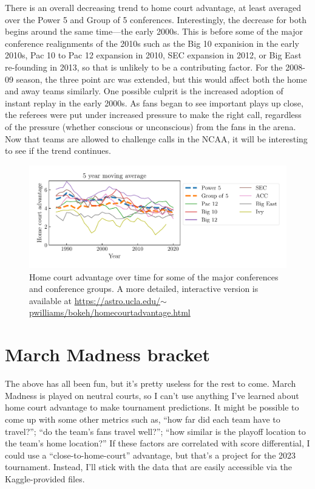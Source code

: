 \documentclass[twocolumn]{aastex63}
\begin{document}
There is an overall decreasing trend to home court advantage, at least averaged over the Power 5 and Group of 5 conferences.
Interestingly, the decrease for both begins around the same time---the early 2000s.
This is before some of the major conference realignments of the 2010s such as the Big 10 expanision in the early 2010s, Pac 10 to Pac 12 expansion in 2010, SEC expansion in 2012, or Big East re-founding in 2013, so that is unlikely to be a contributing factor.
For the 2008-09 season, the three point arc was extended, but this would affect both the home and away teams similarly.
One possible culprit is the increased adoption of instant replay in the early 2000s.
As fans began to see important plays up close, the referees were put under increased pressure to make the right call, regardless of the pressure (whether conscious or unconscious) from the fans in the arena.
Now that teams are allowed to challenge calls in the NCAA, it will be interesting to see if the trend continues.

\begin{figure}
\centering
\includegraphics[width=6in]{figs/homecourtadvantage_vs_year.pdf}
\caption{Home court advantage over time for some of the major conferences and conference groups. A more detailed, interactive version is available at \href{https://astro.ucla.edu/\~pwilliams/bokeh/homecourtadvantage.html}{https://astro.ucla.edu/$\sim$pwilliams/bokeh/homecourtadvantage.html}}
\label{fig:homecourtadvantage_vs_year}
\end{figure}

\section{March Madness bracket}
\label{sect:marchmadness}
The above has all been fun, but it's pretty useless for the rest to come.
March Madness is played on neutral courts, so I can't use anything I've learned about home court advantage to make tournament predictions.
It might be possible to come up with some other metrics such as, ``how far did each team have to travel?''; ``do the team's fans travel well?''; ``how similar is the playoff location to the team's home location?''
If these factors are correlated with score differential, I could use a ``close-to-home-court'' advantage, but that's a project for the 2023 tournament.
Instead, I'll stick with the data that are easily accessible via the Kaggle-provided files.
\end{document}
